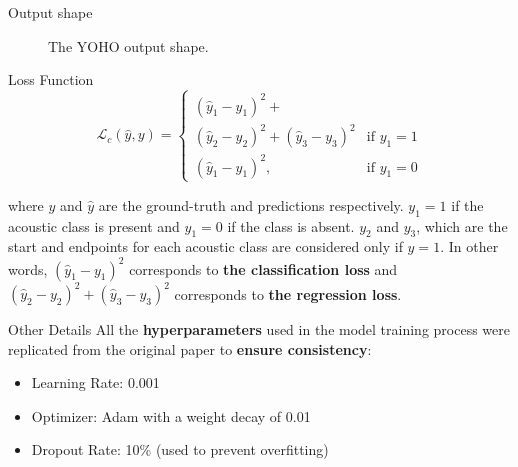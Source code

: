 \begin{frame}{Output shape}
\begin{figure}
			\caption{The YOHO output shape.}
			\label{fig:YOHOoutput}
		\end{figure}
		
	\end{frame}
	

	\begin{frame}{Loss Function}
		\begin{equation*}
			\mathcal{L}_{c}(\hat{y},y) = \begin{cases}
			(\hat{y}_1-y_1)^2+\\(\hat{y}_2-y_2)^2+(\hat{y}_3-y_3)^2 &\text{if $y_{1} = 1$}\\
			(\hat{y}_1-y_1)^2, &\text{if $y_1 = 0$}
			\end{cases}
		\end{equation*}
		
		where $y$ and $\hat{y}$ are the ground-truth and predictions respectively. $y_1 = 1$ if the acoustic class is present and $y_1 = 0$ if the class is absent. $y_2$ and $y_3$, which are the start and endpoints for each acoustic class are considered only if $y = 1$.
		In other words, $(\hat{y}_1-y_1)^2$ corresponds to \textbf{the classification loss} and $(\hat{y}_2-y_2)^2+(\hat{y}_3-y_3)^2$ corresponds to \textbf{the regression loss}.
		\note{
			\dots
		}
	\end{frame}
	
	\begin{frame}{Other Details}
		All the \textbf{hyperparameters} used in the model training process were replicated from the original paper to \textbf{ensure consistency}:
		
		\begin{itemize}
			\item Learning Rate: 0.001
			\item Optimizer: Adam with a weight decay of 0.01
			\item Dropout Rate: 10\% (used to prevent overfitting)

		
		\end{itemize}
		
		\note{
			\dots
		}
	\end{frame}

